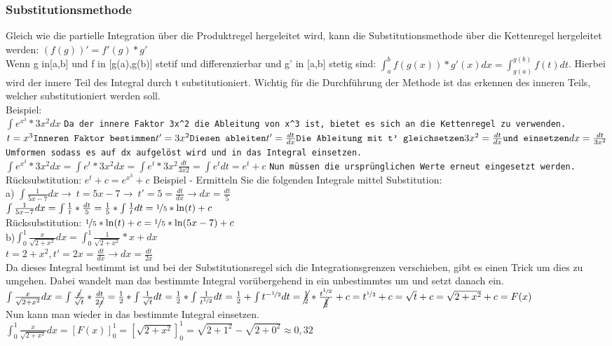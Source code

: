 \documentclass{article}
\begin{document}
	\subsubsection{Substitutionsmethode}
	Gleich wie die partielle Integration über die Produktregel hergeleitet wird, kann die Substitutionsmethode über die Kettenregel hergeleitet werden: $(f(g))'=f'(g)*g'$ \\
	Wenn g in[a,b] und f in [g(a),g(b)] stetif und differenzierbar und g' in [a,b] stetig sind: $\int_{a}^{b}f(g(x))*g'(x)dx=\int_{g(a)}^{g(b)}f(t)dt$. Hierbei wird der innere Teil des Integral durch t substitutioniert. Wichtig für die Durchführung der Methode ist das erkennen des inneren Teils, welcher substitutioniert werden soll. \\
	Beispiel: \\
	$\int e^{x^3}*3x^2dx$ \verb|Da der innere Faktor 3x^2 die Ableitung von x^3 ist, bietet es sich an die Kettenregel zu verwenden.| \\
	$t=x^3 \verb|Inneren Faktor bestimmen|\\
	t'=3x^2 \verb|Diesen ableiten|\\
	t'=\frac{dt}{dx} \verb|Die Ableitung mit t' gleichsetzen|\\
	3x^2=\frac{dt}{dx} \verb|und einsetzen|\\
	dx=\frac{dt}{3x^2}$ \verb|Umformen sodass es auf dx aufgelöst wird und in das Integral einsetzen.|\\
	$\int e^{x^3}*3x^2dx=\int e^t*3x^2dx=\int e^t*3x^2\frac{dt}{3x2}=\int e^tdt=e^t+c$ \verb|Nun müssen die ursprünglichen Werte erneut eingesetzt werden.| \\
	Rücksubstitution: $e^t+c=e^{x^3}+c$
	Beispiel - Ermitteln Sie die folgenden Integrale mittel Substitution: \\
	a) $\int \frac{1}{5x-7}dx\to\ t=5x-7\to\ t'=5=\frac{dt}{dx}\rightarrow dx=\frac{dt}{5}$ \\
	$\int \frac{1}{5x-7}dx=\int \frac{1}{t}*\frac{dt}{5}=\frac{1}{5}*\int \frac{1}{t}dt=\nicefrac{1}{5}*\ln(t)+c$\\
	Rücksubstitution: $\nicefrac{1}{5}*\ln(t)+c=\nicefrac{1}{5}*\ln(5x-7)+c$ \\
	b)$\int_{0}^{1}\frac{x}{\sqrt{2+x^2}}dx=\int_{0}^{1}\frac{1}{\sqrt{2+x^2}}*x+dx$ \\
	$t=2+x^2, t'=2x=\frac{dt}{dx}\rightarrow dx=\frac{dt}{2x}$ \\
	Da dieses Integral bestimmt ist und bei der Substitutionsregel sich die Integrationsgrenzen verschieben, gibt es einen Trick um dies zu umgehen. Dabei wandelt man das bestimmte Integral vorübergehend in ein unbestimmtes um und setzt danach ein. \\
	$\int \frac{x}{\sqrt{2+x^2}}dx=\int \frac{\cancel{x}}{\sqrt{t}}*\frac{dt}{2\cancel{x}}=\frac{1}{2}*\int\frac{1}{\sqrt{t}}dt=\frac{1}{2}*\int \frac{1}{t^{\nicefrac{1}{2}}}dt=\frac{1}{2}+\int t^{-\nicefrac{1}{2}}dt=\cancel{\frac{1}{2}}*\frac{t^{\nicefrac{1}{2}}}{\cancel{\frac{1}{2}}}+c=t^{\nicefrac{1}{2}}+c=\sqrt{t}+c=\sqrt{2+x^2}+c=F(x)$ \\
	Nun kann man wieder in das bestimmte Integral einsetzen. \\
	$\int_{0}^{1}\frac{x}{\sqrt{2+x^2}}dx=[F(x)]^1_0=[\sqrt{2+x^2}]^1_0=\sqrt{2+1^2}-\sqrt{2+0^2}\approx0,32$
\end{document}
